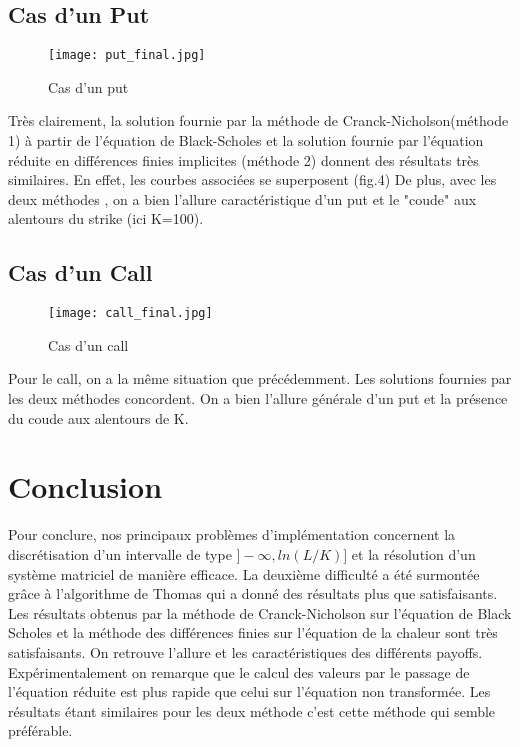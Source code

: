 \documentclass[11pt,a4paper]{article}
\begin{document}
\subsection{Cas d'un Put}
\begin{figure}[h]

             \texttt{[image: put\_final.jpg]}
         \caption{Cas d'un put}
        
 
  
\end{figure}
Très clairement, la solution fournie par la méthode de Cranck-Nicholson(méthode 1) à partir de l'équation de Black-Scholes et la solution fournie par l'équation réduite en différences finies implicites (méthode 2) donnent des résultats très similaires. En effet, les courbes associées se superposent (fig.4) De plus, avec les deux  méthodes  , on a bien l'allure caractéristique d'un put et le "coude" aux alentours du strike (ici K=100). 
\newpage
\subsection{Cas d'un Call}
\begin{figure}[h]

             \texttt{[image: call\_final.jpg]}
         \caption{Cas d'un call}
 
\end{figure}
Pour le call, on a la même situation que précédemment. Les solutions fournies par les deux méthodes concordent. On a bien l'allure générale d'un put et la présence du coude aux alentours de K.
\newpage
\section{Conclusion}
Pour conclure, nos principaux problèmes d'implémentation concernent la discrétisation d'un intervalle de type $]-\infty, ln(L/K)]$ et la résolution d'un système matriciel de manière efficace. La deuxième difficulté a été surmontée grâce à l'algorithme de Thomas qui a donné des résultats plus que satisfaisants. Les résultats obtenus par la méthode de Cranck-Nicholson sur l'équation de Black Scholes et la méthode des différences finies sur l'équation de la chaleur  sont très satisfaisants. On retrouve l'allure et les caractéristiques des différents payoffs. Expérimentalement on remarque que le calcul des valeurs par le passage de l'équation réduite est plus rapide que celui sur l'équation non transformée. Les résultats étant similaires pour les deux méthode c'est cette méthode qui semble préférable.
\end{document}
